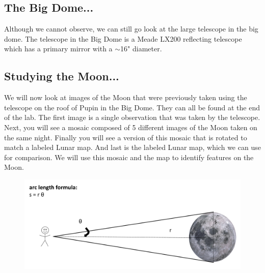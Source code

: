 \documentclass[12pt]{article}%
\begin{document}
\subsection*{The Big Dome...}
Although we cannot observe, we can still go look at the large telescope in the big dome. The telescope in the Big Dome is a Meade LX200 reflecting telescope which has a primary mirror with a $\sim$16" diameter.

\subsection*{Studying the Moon...}
We will now look at images of the Moon that were previously taken using the telescope on the roof of Pupin in the Big Dome. They can all be found at the end of the lab. The first image is a single observation that was taken by the telescope. Next, you will see a mosaic composed of 5 different images of the Moon taken on the same night. Finally you will see a version of this mosaic that is rotated to match a labeled Lunar map. And last is the labeled Lunar map, which we can use for comparison. We will use this mosaic and the map to identify features on the Moon.

\begin{figure}[htb!]
\center
\includegraphics[width=15cm]{arc_length.pdf}
\end{figure}
\end{document}
